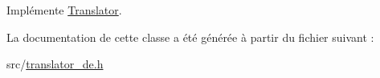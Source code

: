 Implémente \hyperlink{class_translator_a31e719b4e290a359ddbb78132bf3f494}{Translator}.



La documentation de cette classe a été générée à partir du fichier suivant \+:\begin{DoxyCompactItemize}
\item 
src/\hyperlink{translator__de_8h}{translator\+\_\+de.\+h}\end{DoxyCompactItemize}
